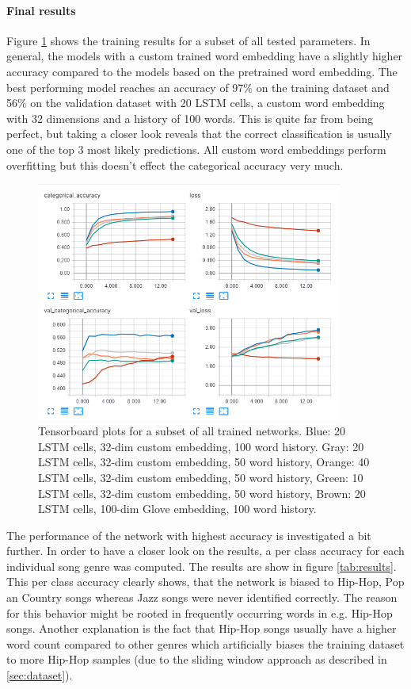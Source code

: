 \documentclass[12pt]{article}
\begin{document}
\paragraph*{Final results}
Figure \ref{fig:results} shows the training results for a subset of all tested parameters. In general, the models with a custom trained word embedding have a slightly higher accuracy compared to the models based on the pretrained word embedding. The best performing model reaches an accuracy of 97\% on the training dataset and 56\% on the validation dataset with 20 LSTM cells, a custom word embedding with 32 dimensions and a history of 100 words. This is quite far from being perfect, but taking a closer look reveals that the correct classification is usually one of the top 3 most likely predictions. All custom word embeddings perform overfitting but this doesn't effect the categorical accuracy very much.

\begin{figure}[t!]
	\centering
	\includegraphics[width=0.9\textwidth]{img/results.png}
	\caption{Tensorboard plots for a subset of all trained networks. Blue: 20 LSTM cells, 32-dim custom embedding, 100 word history. Gray: 20 LSTM cells, 32-dim custom embedding, 50 word history, Orange: 40 LSTM cells, 32-dim custom embedding, 50 word history, Green: 10 LSTM cells, 32-dim custom embedding, 50 word history, Brown: 20 LSTM cells, 100-dim Glove embedding, 100 word history.}
	\label{fig:results}
\end{figure}

The performance of the network with highest accuracy is investigated a bit further. In order to have a closer look on the results, a per class accuracy for each individual song genre was computed. The results are show in figure \ref{tab:results}. This per class accuracy clearly shows, that the network is biased to Hip-Hop, Pop an Country songs whereas Jazz songs were never identified correctly. The reason for this behavior might be rooted in frequently occurring words in e.g. Hip-Hop songs. Another explanation is the fact that Hip-Hop songs usually have a higher word count compared to other genres which artificially biases the training dataset to more Hip-Hop samples (due to the sliding window approach as described in \ref{sec:dataset}). 
\end{document}
